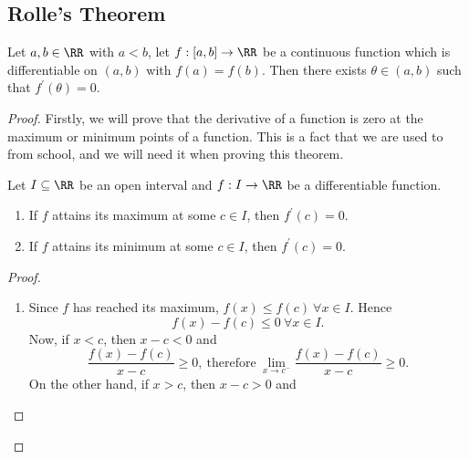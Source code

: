\documentclass[../real_analysis.tex]{subfiles}
\begin{document}
        \subsection{Rolle's Theorem}\label{subsec:rolles-theorem}
            \begin{theorem}\label{thm:rolles-thm}
                Let $a,b\in\RR$ with $a<b$, let $f:[a,b]\to\RR$ be a continuous function which is differentiable on $(a,b)$ with $f(a)=f(b)$. Then there exists $\theta\in(a,b)$ such that $f^\prime(\theta)=0$.
            \end{theorem}
            \begin{proof}
                Firstly, we will prove that the derivative of a function is zero at the maximum or minimum points of a function. This is a fact that we are used to from school, and we will need it when proving this theorem.
                \begin{lemma}
                    Let $I\subseteq\RR$ be an open interval and $f:I\to\RR$ be a differentiable function.
                    \begin{enumerate}[label={\upshape(\roman*)}]
                        \item If $f$ attains its maximum at some $c\in I$, then $f^\prime(c)=0$.
                        \item If $f$ attains its minimum at some $c\in I$, then $f^\prime(c)=0$.
                    \end{enumerate}
                \end{lemma}
                \begin{proof}
                    \begin{enumerate}[label={\upshape(\roman*)}]
                        \item Since $f$ has reached its maximum, $f(x)\leq f(c)\ \forall x\in I$. Hence
                        \begin{equation}
                            f(x)-f(c)\leq 0\ \forall x\in I.
                        \end{equation}
                        Now, if $x<c$, then $x-c<0$ and
                        \begin{equation}
                            \frac{f(x)-f(c)}{x-c}\geq0,\ \text{therefore}\ \lim_{x\to c^-}\frac{f(x)-f(c)}{x-c}\geq0.
                        \end{equation}
                        On the other hand, if $x>c$, then $x-c>0$ and
                        \begin{equation}

\end{equation}
\end{enumerate}
\end{proof}
\end{proof}
\end{document}
